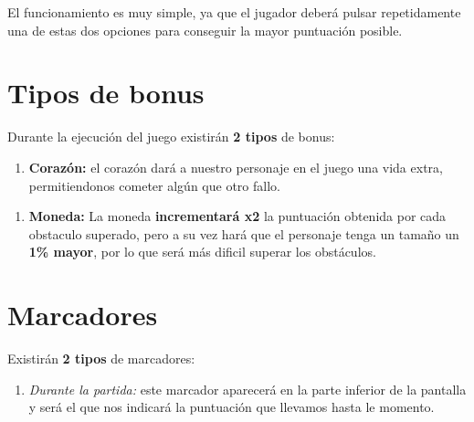 \documentclass[12zpt]{article}
\begin{document}
El funcionamiento es muy simple, ya que el jugador deberá pulsar repetidamente una de estas dos opciones para conseguir la mayor puntuación posible.


\section{Tipos de bonus}
Durante la ejecución del juego existirán \textbf{2 tipos} de bonus:

\begin{enumerate}
	\item \textbf{Corazón:} el corazón dará a nuestro personaje en el juego una vida extra, permitiendonos cometer algún que otro fallo.
\end{enumerate}
\noindent{} 

\begin{enumerate}
	\item \textbf{Moneda:} La moneda \textbf{incrementará x2} la puntuación obtenida por cada obstaculo superado, pero a su vez hará que el personaje
	tenga un tamaño un \textbf{1\% mayor}, por lo que será más dificil superar los obstáculos.
\end{enumerate}
\noindent{}


\section{Marcadores}

Existirán \textbf{2 tipos} de marcadores:

\begin{enumerate}
	\item \textit{Durante la partida:} este marcador aparecerá en la parte inferior de la pantalla y será el que nos indicará la puntuación que llevamos hasta le momento.
\end{enumerate}
\noindent{}
\end{document}
